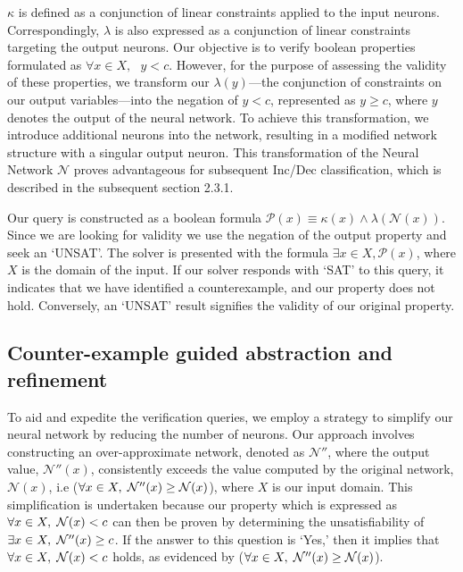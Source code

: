$\kappa$ is defined as a conjunction of linear constraints applied to the input neurons. Correspondingly, $\lambda$ is also expressed as a conjunction of linear constraints targeting the output neurons. Our objective is to verify boolean properties formulated as $\forall x \in X,\textit{ } y < c$. However, for the purpose of assessing the validity of these properties, we transform our $\lambda(y)$—the conjunction of constraints on our output variables—into the negation of $y < c$, represented as $y \geq c$, where $y$ denotes the output of the neural network. To achieve this transformation, we introduce additional neurons into the network, resulting in a modified network structure with a singular output neuron. This transformation of the Neural Network $\mathcal{N}$ proves advantageous for subsequent Inc/Dec classification, which is described in the subsequent section 2.3.1.

Our query is constructed as a boolean formula \(\mathcal{P}(x) \equiv \kappa(x) \land \lambda(\mathcal{N}(x))\). Since we are looking for validity we use the negation of the output property and seek an `UNSAT'. The solver is presented with the formula \(\exists x \in X, \mathcal{P}(x)\), where \(X\) is the domain of the input. If our solver responds with `SAT' to this query, it indicates that we have identified a counterexample, and our property does not hold. Conversely, an `UNSAT' result signifies the validity of our original property.


\subsection{Counter-example guided abstraction and refinement}
To aid and expedite the verification queries, we employ a strategy to simplify our neural network by reducing the number of neurons. Our approach involves constructing an over-approximate network, denoted as $\mathcal{N''}$, where the output value, $\mathcal{N''}(x)$, consistently exceeds the value computed by the original network, $\mathcal{N}(x)$, i.e ($\forall x \in X, \hspace{1mm} \mathcal{N''}(x) \geq \mathcal{N}(x)$), where $X$ is our input domain. This simplification is undertaken because our property which is expressed as $\forall x \in X, \hspace{1mm} \mathcal{N}(x) < c$ can then be proven by determining the unsatisfiability of $\exists x \in X, \hspace{1mm}\mathcal{N''}(x) \geq c$. If the answer to this question is `Yes,' then it implies that $\forall x \in X, \hspace{1mm} \mathcal{N}(x) < c$ holds, as evidenced by ($\forall x \in X, \hspace{1mm} \mathcal{N''}(x) \geq \mathcal{N}(x)$).



